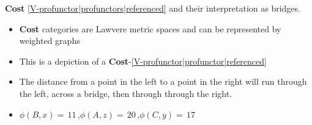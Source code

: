 
\textbf{Cost} \ref{V-profunctor|profunctors|referenced} and their interpretation as bridges.
\begin{itemize}
  \item \textbf{Cost} categories are Lawvere metric spaces and can be represented by weighted graphs
  \item This is a depiction of a \textbf{Cost}-\ref{V-profunctor|profunctor|referenced}


  \item The distance from a point in the left to a point in the right will run through the left, across a bridge, then through through the right.
  \item $\phi(B,x)=$\,$11$\,,$\phi(A,z)=$\,$20$\,,$\phi(C,y)=$\,$17$\,

\end{itemize}